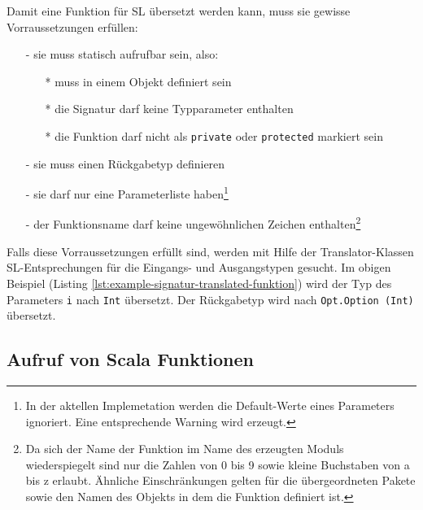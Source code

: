 \documentclass[12pt]{scrreprt}
\begin{document}
Damit eine Funktion für \ac{SL} übersetzt werden kann, muss sie gewisse Vorraussetzungen erfüllen:
\begin{itemize}
 \item[-]{sie muss statisch aufrufbar sein, also:}
 \begin{itemize}
  \item[*]{muss in einem Objekt definiert sein}
  \item[*]{die Signatur darf keine Typparameter enthalten}
  \item[*]{die Funktion darf nicht als \lstinline!private! oder \lstinline!protected! markiert sein}
 \end{itemize}
 \item[-]{sie muss einen Rückgabetyp definieren}
 \item[-]{sie darf nur eine Parameterliste haben\footnote{In der aktellen Implemetation werden die Default-Werte eines Parameters ignoriert. Eine entsprechende Warning wird erzeugt.}}
 \item[-]{der Funktionsname darf keine ungewöhnlichen Zeichen enthalten\footnote{Da sich der Name der Funktion im Name des erzeugten Moduls wiederspiegelt sind nur die Zahlen von 0 bis 9 sowie kleine Buchstaben von a bis z erlaubt. Ähnliche Einschränkungen gelten für die übergeordneten Pakete sowie den Namen des Objekts in dem die Funktion definiert ist.}}
\end{itemize}
Falls diese Vorraussetzungen erfüllt sind, werden mit Hilfe der Translator-Klassen SL-Entsprechungen für die Eingangs- und Ausgangstypen gesucht. Im obigen Beispiel (Listing \ref{lst:example-signatur-translated-funktion}) wird  der Typ des Parameters \lstinline!i! nach \lstinline!Int! übersetzt. Der Rückgabetyp wird nach \lstinline!Opt.Option (Int)! übersetzt. 



%




\subsection{Aufruf von Scala Funktionen}
\label{subs:call-scala-functions}

\end{document}
